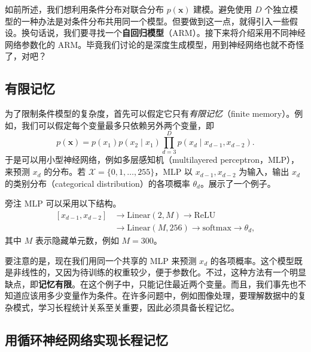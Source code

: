 如前所述，我们想利用条件分布对联合分布 $p(\mathbf{x})$ 建模。避免使用 $D$ 个独立模型的一种办法是对条件分布共用同一个模型。但要做到这一点，就得引入一些假设。换句话说，我们要寻找一个\textbf{自回归模型}（ARM）。接下来将介绍采用不同神经网络参数化的 ARM。毕竟我们讨论的是深度生成模型，用到神经网络也就不奇怪了，对吧？

\subsection{有限记忆}

为了限制条件模型的复杂度，首先可以假定它只有\emph{有限记忆}（finite memory）。例如，我们可以假定每个变量最多只依赖另外两个变量，即
\begin{equation}
p(\mathbf{x})=p(x_1)p(x_2\mid x_1)\prod_{d=3}^D p(x_d\mid x_{d-1},x_{d-2}).
\tag{3.5}\label{eq:03-05}
\end{equation}
于是可以用小型神经网络，例如多层感知机（multilayered perceptron，MLP），来预测 $x_d$ 的分布。若 $\mathcal{X}=\{0,1,\ldots,255\}$，MLP 以 $x_{d-1},x_{d-2}$ 为输入，输出 $x_d$ 的类别分布（categorical distribution）的各项概率 $\theta_d$。展示了一个例子。

\begin{booknote}{旁注}
MLP 可以采用以下结构。
\[
\begin{aligned}
\left[x_{d-1},x_{d-2}\right] &\to \mathrm{Linear}(2,M)\to \mathrm{ReLU}\\
&\to \mathrm{Linear}(M,256)\to \mathrm{softmax}\to\theta_d,
\end{aligned}
\]
其中 $M$ 表示隐藏单元数，例如 $M=300$。
\end{booknote}


要注意的是，现在我们用同一个共享的 MLP 来预测 $x_d$ 的各项概率。这个模型既是非线性的，又因为待训练的权重较少，便于参数化。不过，这种方法有一个明显缺点，即\textbf{记忆有限}。在这个例子中，只能记住最近两个变量。而且，我们事先也不知道应该用多少变量作为条件。在许多问题中，例如图像处理，要理解数据中的复杂模式，学习长程统计关系至关重要，因此必须具备长程记忆。

\subsection{用循环神经网络实现长程记忆}

